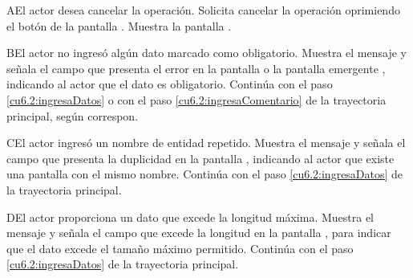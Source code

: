  \begin{UCtrayectoriaA}{A}{El actor desea cancelar la operación.}
    \UCpaso[\UCactor] Solicita cancelar la operación oprimiendo el botón  de la pantalla .
    \UCpaso[\UCsist] Muestra la pantalla .
 \end{UCtrayectoriaA} 
 \begin{UCtrayectoriaA}{B}{El actor no ingresó algún dato marcado como obligatorio.}
    \UCpaso[\UCsist] Muestra el mensaje  y señala el campo que presenta el error en la pantalla 
	     o la pantalla emergente , indicando al actor que el dato es obligatorio.
    \UCpaso[] Continúa con el paso \ref{cu6.2:ingresaDatos} o con el paso \ref{cu6.2:ingresaComentario} de la trayectoria principal, según correspon.
 \end{UCtrayectoriaA}
 \begin{UCtrayectoriaA}{C}{El actor ingresó un nombre de entidad repetido.}
    \UCpaso[\UCsist] Muestra el mensaje  y señala el campo que presenta la duplicidad en la pantalla 
	    , indicando al actor que existe una pantalla con el mismo nombre.
    \UCpaso[] Continúa con el paso \ref{cu6.2:ingresaDatos} de la trayectoria principal.
 \end{UCtrayectoriaA}
 
 \begin{UCtrayectoriaA}{D}{El actor proporciona un dato que excede la longitud máxima.}
    \UCpaso[\UCsist] Muestra el mensaje  y señala el campo que excede la 
    longitud en la pantalla , para indicar que el dato excede el tamaño máximo permitido.
    \UCpaso[] Continúa con el paso \ref{cu6.2:ingresaDatos} de la trayectoria principal.
 \end{UCtrayectoriaA}
 
